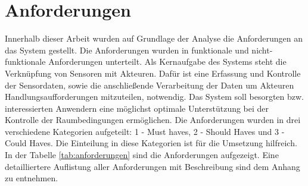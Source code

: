 \section{Anforderungen}
Innerhalb dieser Arbeit wurden auf Grundlage der Analyse die Anforderungen an das System gestellt. Die Anforderungen wurden in funktionale und nicht-funktionale Anforderungen unterteilt. Als Kernaufgabe des Systems steht die Verknüpfung von Sensoren mit Akteuren. Dafür ist eine Erfassung und Kontrolle der Sensordaten, sowie die anschließende Verarbeitung der Daten um Akteuren Handlungsaufforderungen mitzuteilen, notwendig. Das System soll besorgten bzw. interessierten Anwendern eine möglichst optimale Unterstützung bei der Kontrolle der Raumbedingungen ermöglichen. Die Anforderungen wurden in drei verschiedene Kategorien aufgeteilt: 1 - Must haves, 2 - Should Haves und 3 - Could Haves. Die Einteilung in diese Kategorien ist für die Umsetzung hilfreich. In der Tabelle \ref{tab:anforderungen} sind die Anforderungen aufgezeigt. Eine detailliertere Auflistung aller Anforderungen mit Beschreibung sind dem Anhang zu entnehmen.\\

